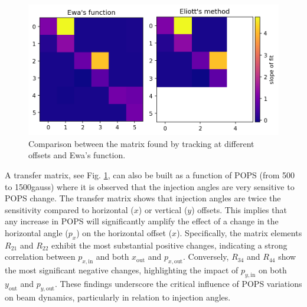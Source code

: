 \begin{figure}[H]
\centering
\includegraphics[width=1.0\textwidth]{02_Simulation/images/transfer_matrix_color.png}
\caption{Comparison between the matrix found by tracking at different offsets and Ewa's function.}
\label{fig:transfer_matrix_color}
\end{figure}





A transfer matrix, see Fig. \ref{fig:transfer_matrix_color}, can also be built as a function of POPS (from \si{500} to \si{1500}{gauss}) where it is observed that the injection angles are very sensitive to POPS change. The transfer matrix shows that injection angles are twice the sensitivity compared to horizontal (\(x\)) or vertical (\(y\)) offsets. This implies that any increase in POPS will significantly amplify the effect of a change in the horizontal angle (\(p_x\)) on the horizontal offset (\(x\)). Specifically, the matrix elements \(R_{21}\) and \(R_{22}\) exhibit the most substantial positive changes, indicating a strong correlation between \(p_{x,\text{in}}\) and both \(x_{\text{out}}\) and \(p_{x,\text{out}}\). Conversely, \(R_{34}\) and \(R_{44}\) show the most significant negative changes, highlighting the impact of \(p_{y,\text{in}}\) on both \(y_{\text{out}}\) and \(p_{y,\text{out}}\). These findings underscore the critical influence of POPS variations on beam dynamics, particularly in relation to injection angles.


